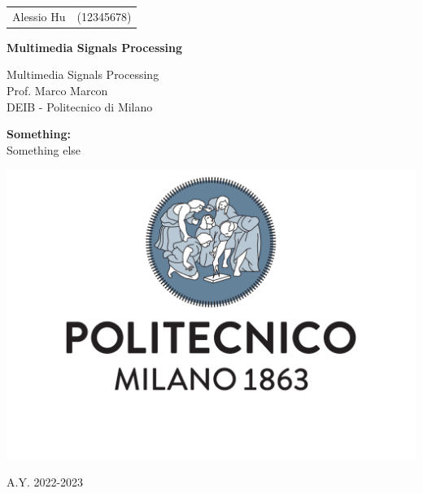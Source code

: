 \documentclass[a4paper, 11pt]{article}
\begin{document}
\begin{titlepage}
	\centering
    \begin{tabular}{rl}
        Alessio Hu & (12345678)
    \end{tabular}

    \vspace{1.5cm}
    {\Huge \textbf{Multimedia Signals Processing\\}}
    \vspace{1.5cm}
    {\large 
        Multimedia Signals Processing \\
        Prof. Marco Marcon \\ 
		DEIB - Politecnico di Milano \par
    }
    \vspace{1.5cm}
    {\large \textbf{Something:}\\
    \vspace{0.5cm}
    Something else}
    \par
    \vspace{3cm}
    \includegraphics[scale=0.4]{images/logo.pdf}
    \par
    \vspace{3cm}
	A.Y. 2022-2023
\end{titlepage}

\tableofcontents
    
    
    
    
    
    
    
    
    
\end{document}
